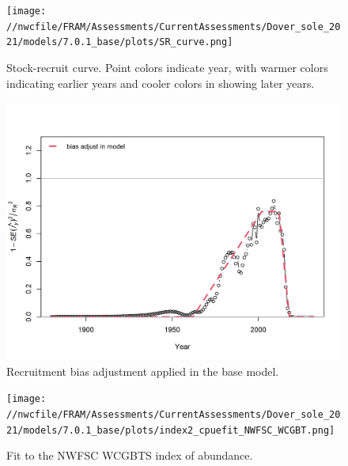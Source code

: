 \documentclass[11pt,
  english,
  a4paper,
]{article}
\begin{document}
\tagmcend\tagstructend


\begin{figure}
\centering
\texttt{[image: //nwcfile/FRAM/Assessments/CurrentAssessments/Dover\_sole\_2021/models/7.0.1\_base/plots/SR\_curve.png]}
\caption{Stock-recruit curve. Point colors indicate year, with warmer colors indicating earlier years and cooler colors in showing later years.\label{fig:bh-curve}}
\end{figure}

\tagmcend\tagstructend


\begin{figure}
\centering
\includegraphics[width=1\textwidth,height=1\textheight]{figs/recruit_fit_bias_adjust.png}
\caption{Recruitment bias adjustment applied in the base model.\label{fig:bias-adj}}
\end{figure}

\tagmcend\tagstructend


\begin{figure}
\centering
\texttt{[image: //nwcfile/FRAM/Assessments/CurrentAssessments/Dover\_sole\_2021/models/7.0.1\_base/plots/index2\_cpuefit\_NWFSC\_WCGBT.png]}
\caption{Fit to the NWFSC WCGBTS index of abundance.\label{fig:wcgbt-index-fit}}
\end{figure}
\end{document}
